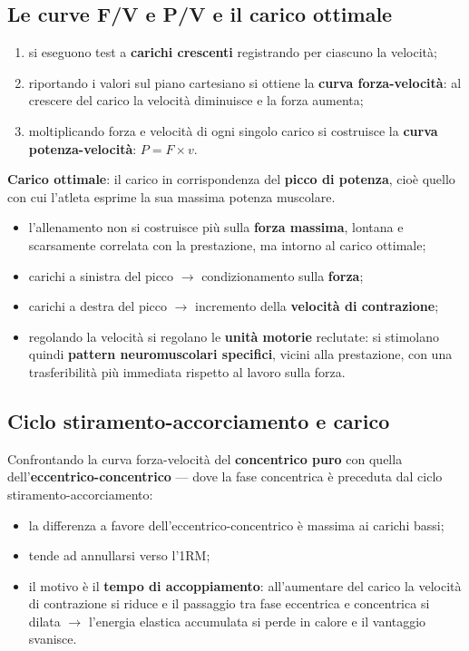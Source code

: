 \subsection{Le curve F/V e P/V e il carico ottimale}

\begin{enumerate}
  \item si eseguono test a \textbf{carichi crescenti} registrando per ciascuno la velocità;
  \item riportando i valori sul piano cartesiano si ottiene la \textbf{curva forza-velocità}: al
    crescere del carico la velocità diminuisce e la forza aumenta;
  \item moltiplicando forza e velocità di ogni singolo carico si costruisce la \textbf{curva
    potenza-velocità}: $P = F \times v$.
\end{enumerate}

\textbf{Carico ottimale}: il carico in corrispondenza del \textbf{picco di potenza}, cioè quello con
cui l'atleta esprime la sua massima potenza muscolare.
\begin{itemize}
  \item l'allenamento non si costruisce più sulla \textbf{forza massima}, lontana e scarsamente
    correlata con la prestazione, ma intorno al carico ottimale;
  \item carichi a sinistra del picco $\rightarrow$ condizionamento sulla \textbf{forza};
  \item carichi a destra del picco $\rightarrow$ incremento della \textbf{velocità di contrazione};
  \item regolando la velocità si regolano le \textbf{unità motorie} reclutate: si stimolano quindi
    \textbf{pattern neuromuscolari specifici}, vicini alla prestazione, con una trasferibilità più
    immediata rispetto al lavoro sulla forza.
\end{itemize}

\subsection{Ciclo stiramento-accorciamento e carico}

Confrontando la curva forza-velocità del \textbf{concentrico puro} con quella
  dell'\textbf{eccentrico-concentrico} --- dove la fase concentrica è preceduta dal ciclo
  stiramento-accorciamento:
\begin{itemize}
  \item la differenza a favore dell'eccentrico-concentrico è massima ai carichi bassi;
  \item tende ad annullarsi verso l'1RM;
  \item il motivo è il \textbf{tempo di accoppiamento}: all'aumentare del carico la velocità di
    contrazione si riduce e il passaggio tra fase eccentrica e concentrica si dilata $\rightarrow$
    l'energia elastica accumulata si perde in calore e il vantaggio svanisce.
\end{itemize}

